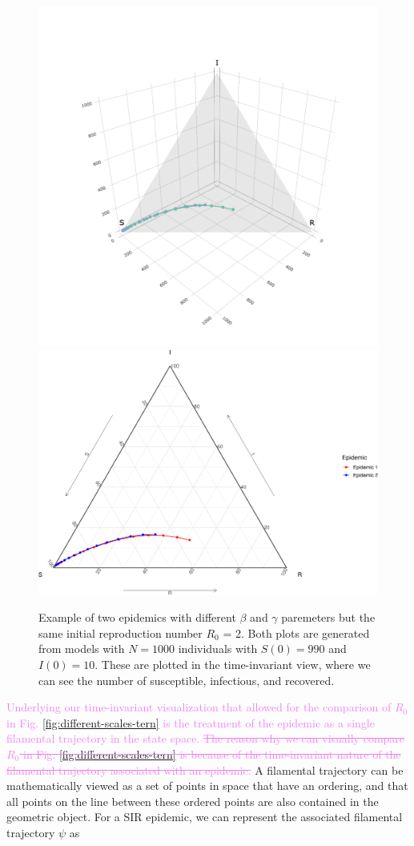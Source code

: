 \documentclass[
  shortnames]{jss}
\begin{document}
\begin{CodeChunk}
\begin{figure}[H]

{\centering \includegraphics[width=0.49\linewidth]{images/vis3d} \includegraphics[width=0.49\linewidth]{Figs/unnamed-chunk-3-2} 

}

\caption{\label{fig:different-scales-tern}Example of two epidemics with different $\beta$ and $\gamma$ paremeters but the same initial reproduction number $R_0$ = 2.  Both plots are generated from models with $N= 1000$ individuals with $S(0) = 990$ and $I(0) = 10$.  These are plotted in the time-invariant view, where we can see the number of susceptible, infectious, and recovered.}\label{fig:unnamed-chunk-3}
\end{figure}
\end{CodeChunk}

\textcolor{violet}{Underlying our time-invariant visualization that allowed for the comparison of $R_0$ in Fig. \ref{fig:different-scales-tern} is the treatment of the epidemic as a single filamental trajectory in the state space. \sout{The reason why we can visually compare $R_0$ in Fig. \ref{fig:different-scales-tern} is because of the time-invariant nature of the filamental trajectory associated with an epidemic.}}
A filamental trajectory can be mathematically viewed as a set of points
in space that have an ordering, and that all points on the line between
these ordered points are also contained in the geometric object. For a
SIR epidemic, we can represent the associated filamental trajectory
\(\psi\) as
\end{document}
